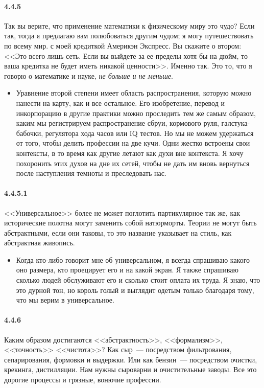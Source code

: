 \paragraph{4.4.5}\hypertarget{par:4.4.5}{} Так вы верите, что применение математики к физическому миру это чудо? Если так, тогда я предлагаю вам полюбоваться другим чудом; я могу путешествовать по всему мир. с моей кредиткой Америкэн Экспресс. Вы скажите о втором: <<Это всего лишь сеть. Если вы выйдете за ее пределы хотя бы на дюйм, то ваша кредитка не будет иметь никакой ценности>>. Именно так. Это то, что я говорю о математике и науке, {\itshape не больше и не меньше}. 
	\begin{itemize}
	\item 
	Уравнение второй степени имеет область распространения, которую можно нанести на карту, как и все остальное. Его изобретение, перевод и инкорпорацию в другие практики можно проследить тем же самым образом, каким мы регистрируем распространение сбруи, кормового руля, галстука-бабочки, регулятора хода часов или IQ тестов. Но мы не можем удержаться от того, чтобы делить профессии на две кучи. Одни жестко встроены свои контексты, в то время как другие летают как духи вне контекста. Я хочу похоронить этих духов на дне их сетей, чтобы не дать им вновь вернуться после наступления темноты и преследовать нас.
	\end{itemize}	

\paragraph{4.4.5.1}\hypertarget{par:4.4.5.1}{} <<Универсальное>> более не может поглотить партикулярное так же, как исторические полотна могут заменить собой натюрморты. Теории не могут быть абстрактными, если они таковы, то это название указывает на стиль, как абстрактная живопись. 
	\begin{itemize}
	\item 
	Когда кто-либо говорит мне об универсальном, я всегда спрашиваю какого оно размера, кто проецирует его и на какой экран. Я также спрашиваю сколько людей обслуживают его и сколько стоит оплата их труда. Я знаю, что это дурной тон, но король голый и выглядит одетым только благодаря тому, что мы верим в универсальное.
	\end{itemize}	

\paragraph{4.4.6}\hypertarget{par:4.4.6}{} Каким образом достигаются <<абстрактность>>, <<формализм>>, <<точность>> <<чистота>>? Как сыр~--- посредством фильтрования, сепарирования, формовки и выдержки. Или как бензин~--- посредством очистки, крекинга, дистилляции. Нам нужны сыроварни и очистительные заводы. Все это дорогие процессы и грязные, вонючие профессии.

